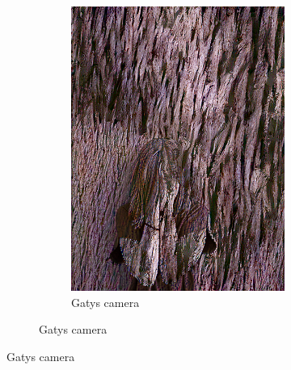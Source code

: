 \begin{figure}[]
\begin{subfigure}{\textwidth}
\begin{subfigure}{0.24\textwidth}
            \includegraphics[width=\textwidth]{images/04-experiment02/human/wood/gatys_proj.jpg}
            \caption*{Gatys camera}
        \end{subfigure}
        

\end{subfigure}
\end{figure}
